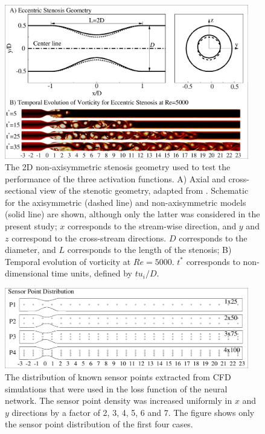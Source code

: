 \documentclass[times,twocolumn,final]{elsarticle}
\begin{document}
{%
\begin{figure}[!t]
\centering
\includegraphics[width=0.95\textwidth]{./Figures/Figure1_StenosisModel}
\caption{The 2D non-axisymmetric stenosis geometry used to test the performance of the three activation functions. A) Axial and cross-sectional view of the stenotic geometry, adapted from \citep{Varghese2007_DNS}. Schematic for the axisymmetric (dashed line) and non-axisymmetric models (solid line) are shown, although only the latter was considered in the present study; $x$ corresponds to the stream-wise direction, and $y$ and $z$ correspond to the cross-stream directions. $D$ corresponds to the diameter, and $L$ corresponds to the length of the stenosis; B) Temporal evolution of vorticity at $Re=5000$. $t^{*}$ corresponds to non-dimensional time units, defined by $tu_{i}/D$. }
\label{fig:Methods_2}
\end{figure}



\begin{figure}[!t]
\centering
\includegraphics[width=0.95\textwidth]{./Figures/Figure2_StenosisModel_Sensors}
\caption{The distribution of known sensor points extracted from CFD simulations that were used in the loss function of the neural network. The sensor point density was increased uniformly in $x$ and $y$ directions by a factor of 2, 3, 4, 5, 6 and 7. The figure shows only the sensor point distribution of the first four cases.}
\label{fig:Methods_3}
\end{figure}

}
\end{document}

